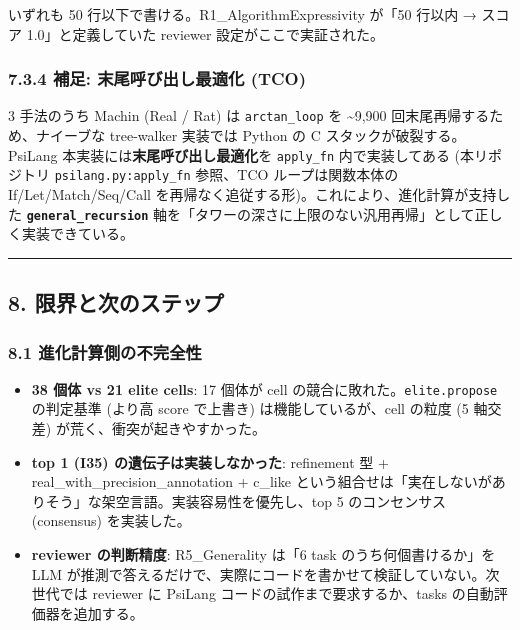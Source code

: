 \documentclass[
]{ltjsarticle}
\providecommand{\tightlist}{%
  \setlength{\itemsep}{0pt}\setlength{\parskip}{0pt}}
\begin{document}
いずれも 50 行以下で書ける。R1\_AlgorithmExpressivity が「50 行以内 →
スコア 1.0」と定義していた reviewer 設定がここで実証された。

\subsubsection{7.3.4 補足: 末尾呼び出し最適化
(TCO)}\label{ux88dcux8db3-ux672bux5c3eux547cux3073ux51faux3057ux6700ux9069ux5316-tco}

3 手法のうち Machin (Real / Rat) は \texttt{arctan\_loop} を
\textasciitilde9,900 回末尾再帰するため、ナイーブな tree-walker 実装では
Python の C スタックが破裂する。PsiLang
本実装には\textbf{末尾呼び出し最適化}を \texttt{apply\_fn}
内で実装してある (本リポジトリ \texttt{psilang.py:apply\_fn} 参照、TCO
ループは関数本体の If/Let/Match/Seq/Call
を再帰なく追従する形)。これにより、進化計算が支持した
\textbf{\texttt{general\_recursion}}
軸を「タワーの深さに上限のない汎用再帰」として正しく実装できている。

\begin{center}\rule{0.5\linewidth}{0.5pt}\end{center}

\subsection{8.
限界と次のステップ}\label{ux9650ux754cux3068ux6b21ux306eux30b9ux30c6ux30c3ux30d7}

\subsubsection{8.1
進化計算側の不完全性}\label{ux9032ux5316ux8a08ux7b97ux5074ux306eux4e0dux5b8cux5168ux6027}

\begin{itemize}
\tightlist
\item
  \textbf{38 個体 vs 21 elite cells}: 17 個体が cell
  の競合に敗れた。\texttt{elite.propose} の判定基準 (より高 score
  で上書き) は機能しているが、cell の粒度 (5 軸交差)
  が荒く、衝突が起きやすかった。
\item
  \textbf{top 1 (I35) の遺伝子は実装しなかった}: refinement 型 +
  real\_with\_precision\_annotation + c\_like
  という組合せは「実在しないがありそう」な架空言語。実装容易性を優先し、top
  5 のコンセンサス (consensus) を実装した。
\item
  \textbf{reviewer の判断精度}: R5\_Generality は「6 task
  のうち何個書けるか」を LLM
  が推測で答えるだけで、実際にコードを書かせて検証していない。次世代では
  reviewer に PsiLang コードの試作まで要求するか、tasks
  の自動評価器を追加する。
\end{itemize}
\end{document}

